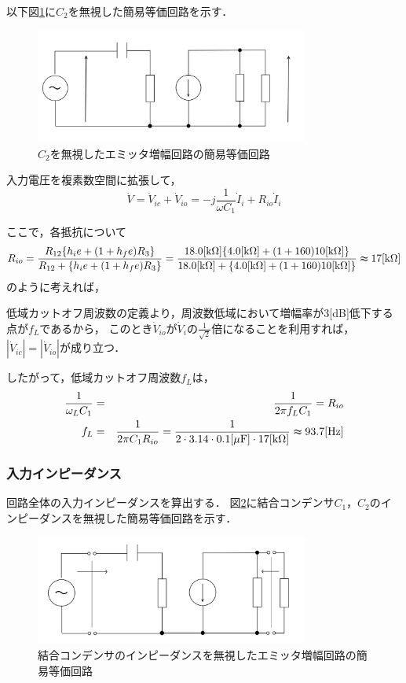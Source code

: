 \documentclass[dvipdfmx,titlepage,a4j]{jsarticle}  %
\numberwithin{equation}{section}
\begin{document}
以下図\ref{fig:fig4-c2.jpg}に$C_2$を無視した簡易等価回路を示す．
\begin{figure}[H]
  \centering
  \includegraphics[width=9cm]{../fig/fig4-c2.jpg}
  \caption{$C_2$を無視したエミッタ増幅回路の簡易等価回路}
  \label{fig:fig4-c2.jpg}
\end{figure}

入力電圧を複素数空間に拡張して，
\begin{equation}
  \dot{V} = \dot{V}_{ic} + \dot{V}_{io} = -j \frac{1}{\omega C_1} \dot{I}_i + R_{io} \dot{I}_i
\end{equation}

ここで，各抵抗について
\begin{equation}
  R_{io} = \frac{R_{12} \{h_ie + ( 1 + h_fe)R_3\}}{R_{12} + \{h_ie + ( 1 + h_fe)R_3\}} = \frac{18.0\mathrm{[k\Omega]} \{4.0 \mathrm{[k \Omega]} + ( 1 + 160) 10 \mathrm{[k \Omega]}\}}{18.0\mathrm{[k\Omega]} + \{4.0 \mathrm{[k \Omega]} + ( 1 + 160)10 \mathrm{[k \Omega]}\}} \thickapprox 17 \mathrm{[k \Omega]}
\end{equation}
のように考えれば，

低域カットオフ周波数の定義より，周波数低域において増幅率が3[dB]低下する点が$f_L$であるから，
このとき$\dot{V}_{io}$が$\dot{V}_{i}$の$\frac{1}{\sqrt{2}}$倍になることを利用すれば，
$\left\lvert \dot{V}_{ic} \right\rvert = \left\lvert \dot{V}_{io} \right\rvert$が成り立つ．

したがって，低域カットオフ周波数$f_L$は，
\begin{eqnarray}
  \frac{1}{\omega_L C_1} &=& \frac{1}{2 \pi f_L C_1} = R_{io} \\
  f_L &=& \frac{1}{2 \pi C_1 R_{io}} =  \frac{1}{2 \cdot 3.14 \cdot 0.1\mathrm{[\mu F]} \cdot 17 \mathrm{[k \Omega]}} \thickapprox 93.7\mathrm{[Hz]}
\end{eqnarray}

\subsubsection{入力インピーダンス}
回路全体の入力インピーダンスを算出する．
図\ref{fig:fig5-im.jpg}に結合コンデンサ$C_1$，$C_2$のインピーダンスを無視した簡易等価回路を示す．
\begin{figure}[H]
  \centering
  \includegraphics[width=9cm]{../fig/fig5-im.jpg}
  \caption{結合コンデンサのインピーダンスを無視したエミッタ増幅回路の簡易等価回路}
  \label{fig:fig5-im.jpg}
\end{figure}
\end{document}
